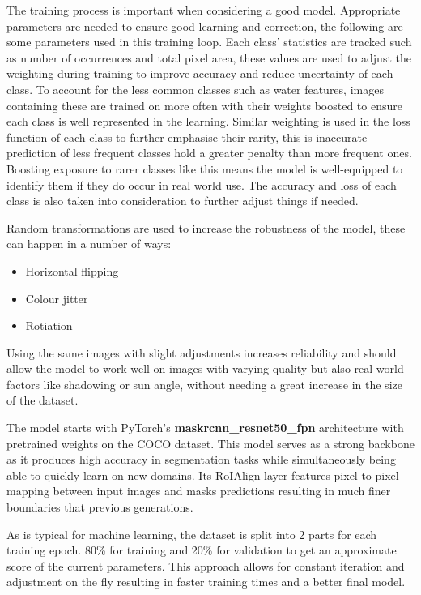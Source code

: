 \documentclass[final]{cmpreport_02}
\begin{document}
The training process is important when considering a good model. 
Appropriate parameters are needed to ensure good learning and correction, the following are some parameters used in this training loop.
Each class' statistics are tracked such as number of occurrences and total pixel area, these values are used to adjust the weighting during training to improve accuracy and reduce uncertainty of each class.
To account for the less common classes such as water features, images containing these are trained on more often with their weights boosted to ensure each class is well represented in the learning.
Similar weighting is used in the loss function of each class to further emphasise their rarity, this is inaccurate prediction of less frequent classes hold a greater penalty than more frequent ones.
Boosting exposure to rarer classes like this means the model is well-equipped to identify them if they do occur in real world use.
The accuracy and loss of each class is also taken into consideration to further adjust things if needed.

Random transformations are used to increase the robustness of the model, these can happen in a number of ways:

\begin{itemize}
	\item{Horizontal flipping}
	\item{Colour jitter}
	\item{Rotiation}
\end{itemize}
Using the same images with slight adjustments increases reliability and should allow the model to work well on images with varying quality but also real world factors like shadowing or sun angle, without needing a great increase in the size of the dataset.

The model starts with PyTorch's \textbf{maskrcnn\_resnet50\_fpn} \citep{he2017mask} architecture with pretrained weights on the COCO \citep{coco} dataset.
This model serves as a strong backbone as it produces high accuracy in segmentation tasks while simultaneously being able to quickly learn on new domains.
Its RoIAlign layer features pixel to pixel mapping between input images and masks predictions resulting in much finer boundaries that previous generations.

As is typical for machine learning, the dataset is split into 2 parts for each training epoch. 80\% for training and 20\% for validation to get an approximate score of the current parameters.
This approach allows for constant iteration and adjustment on the fly resulting in faster training times and a better final model.
\end{document}
